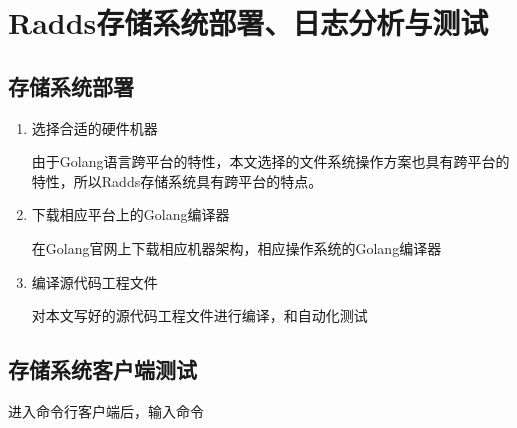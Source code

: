\section{Radds存储系统部署、日志分析与测试}

	\subsection{存储系统部署}

	\begin{enumerate}
		
		\item 选择合适的硬件机器 
		
		由于Golang语言跨平台的特性，本文选择的文件系统操作方案也具有跨平台的特性，所以Radds存储系统具有跨平台的特点。

		
		\item 下载相应平台上的Golang编译器 
		
		在Golang官网上下载相应机器架构，相应操作系统的Golang编译器

		\item 编译源代码工程文件
		
		对本文写好的源代码工程文件进行编译，和自动化测试

	\end{enumerate}



	\subsection{存储系统客户端测试}
	

	进入命令行客户端后，输入命令
	
